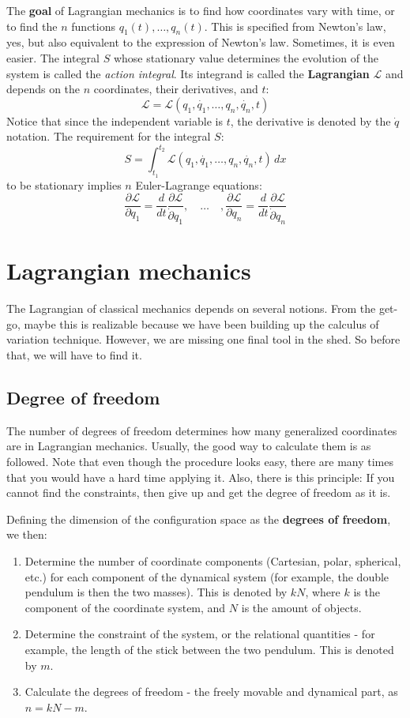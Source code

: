 The \textbf{goal} of Lagrangian mechanics is to find how coordinates vary with time, or to find the $n$ functions $q_{1}(t),\dots,q_{n}(t)$. This is specified from Newton's law, yes, but also equivalent to the expression of Newton's law. Sometimes, it is even easier. The integral $S$ whose stationary value determines the evolution of the system is called the \textit{action integral}. Its integrand is called the \textbf{Lagrangian} $\mathcal{L}$ and depends on the $n$ coordinates, their derivatives, and $t$: $$\mathcal{L}=\mathcal{L}(q_{1},\dot{q_{1}},\dots,q_{n},\dot{q_{n}}, t)$$
Notice that since the independent variable is $t$, the derivative is denoted by the $\dot{q}$ notation. The requirement for the integral $S$: $$S=\int _{t_{1}}^{t_{2}} \mathcal{L}(q_{1},\dot{q_{1}},\dots,q_{n},\dot{q_{n}},t) \, dx $$
to be stationary implies $n$ Euler-Lagrange equations: 
\begin{equation}
  \frac{\partial \mathcal{L}}{\partial q_{1}}=\frac{d}{dt} \frac{\partial \mathcal{L}}{\dot{\partial}q_{1}},\quad \dots \quad , \frac{\partial \mathcal{L}}{\partial q_{n}}= \frac{d}{dt} \frac{\partial \mathcal{L}}{\dot{\partial}q_{n}}
\end{equation}

\section{Lagrangian mechanics}
The Lagrangian of classical mechanics depends on several notions. From the get-go, maybe this is realizable because we have been building up the calculus of variation technique. However, we are missing one final tool in the shed. So before that, we will have to find it. 
\subsection{Degree of freedom}
The number of degrees of freedom determines how many generalized coordinates are in Lagrangian mechanics. Usually, the good way to calculate them is as followed. Note that even though the procedure looks easy, there are many times that you would have a hard time applying it. Also, there is this principle: If you cannot find the constraints, then give up and get the degree of freedom as it is. 

Defining the dimension of the configuration space as the \textbf{degrees of freedom}, we then: 

\begin{enumerate}[topsep=1.25pt,itemsep=1pt]
  \item  Determine the number of coordinate components (Cartesian, polar, spherical, etc.) for each component of the dynamical system (for example, the double pendulum is then the two masses). This is denoted by $kN$, where $k$ is the component of the coordinate system, and $N$ is the amount of objects. 
  \item Determine the constraint of the system, or the relational quantities - for example, the length of the stick between the two pendulum. This is denoted by $m$.
  \item Calculate the degrees of freedom - the freely movable and dynamical part, as $n = kN - m$.
\end{enumerate}

